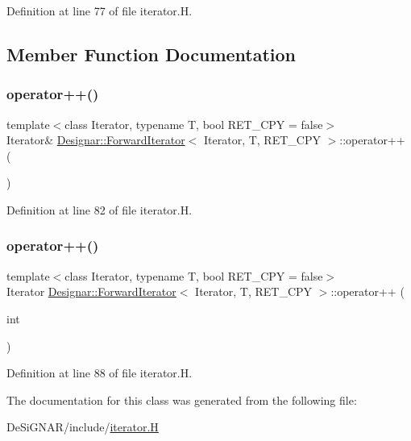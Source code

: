 Definition at line 77 of file iterator.\+H.



\subsection{Member Function Documentation}
\mbox{\label{class_designar_1_1_forward_iterator_a021a9305def76c968872089a778d2b41}} 
\subsubsection{\texorpdfstring{operator++()}{operator++()}\hspace{0.1cm}{\footnotesize\ttfamily [1/2]}}
{\footnotesize\ttfamily template$<$class Iterator, typename T, bool R\+E\+T\+\_\+\+C\+PY = false$>$ \\
Iterator\& \hyperlink{class_designar_1_1_forward_iterator}{Designar\+::\+Forward\+Iterator}$<$ Iterator, T, R\+E\+T\+\_\+\+C\+PY $>$\+::operator++ (\begin{DoxyParamCaption}{ }\end{DoxyParamCaption})\hspace{0.3cm}{\ttfamily [inline]}}



Definition at line 82 of file iterator.\+H.

\mbox{\label{class_designar_1_1_forward_iterator_a7182625f3375ba05868ae6f240628b1c}} 
\subsubsection{\texorpdfstring{operator++()}{operator++()}\hspace{0.1cm}{\footnotesize\ttfamily [2/2]}}
{\footnotesize\ttfamily template$<$class Iterator, typename T, bool R\+E\+T\+\_\+\+C\+PY = false$>$ \\
Iterator \hyperlink{class_designar_1_1_forward_iterator}{Designar\+::\+Forward\+Iterator}$<$ Iterator, T, R\+E\+T\+\_\+\+C\+PY $>$\+::operator++ (\begin{DoxyParamCaption}\item[{int}]{ }\end{DoxyParamCaption})\hspace{0.3cm}{\ttfamily [inline]}}



Definition at line 88 of file iterator.\+H.



The documentation for this class was generated from the following file\+:\begin{DoxyCompactItemize}
\item 
De\+Si\+G\+N\+A\+R/include/\hyperlink{iterator_8_h}{iterator.\+H}\end{DoxyCompactItemize}
